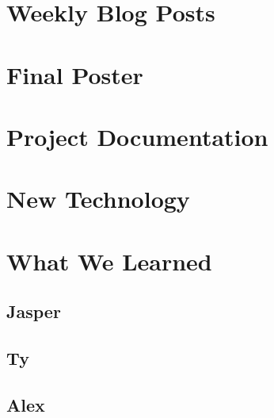 \documentclass[10pt,draftclsnofoot,onecolumn]{IEEEtran}
\begin{document}
\newpage
\section{Weekly Blog Posts} %


\newpage
\section{Final Poster} %

\newpage
\section{Project Documentation} %


\newpage
\section{New Technology} %


\newpage
\section{What We Learned} %
\subsection{Jasper}


\subsection{Ty}


\subsection{Alex}
\end{document}
